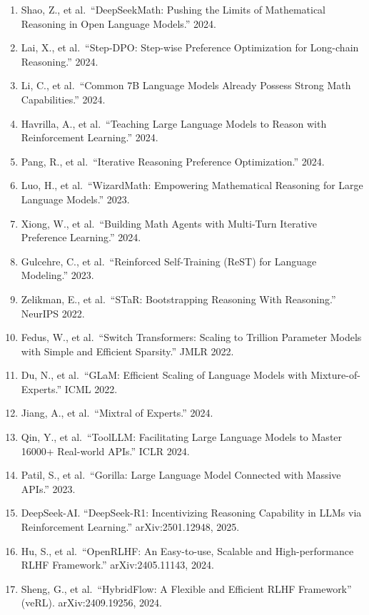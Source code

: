\documentclass[
  american,
  11pt,
  a4paper,
  oneside]{report}
\providecommand{\tightlist}{%
  \setlength{\itemsep}{0pt}\setlength{\parskip}{0pt}}
\begin{document}
\begin{enumerate}
\def\labelenumi{\arabic{enumi}.}
\tightlist
\item
  Shao, Z., et al.~``DeepSeekMath: Pushing the Limits of Mathematical
  Reasoning in Open Language Models.'' 2024.
\item
  Lai, X., et al.~``Step-DPO: Step-wise Preference Optimization for
  Long-chain Reasoning.'' 2024.
\item
  Li, C., et al.~``Common 7B Language Models Already Possess Strong Math
  Capabilities.'' 2024.
\item
  Havrilla, A., et al.~``Teaching Large Language Models to Reason with
  Reinforcement Learning.'' 2024.
\item
  Pang, R., et al.~``Iterative Reasoning Preference Optimization.''
  2024.
\item
  Luo, H., et al.~``WizardMath: Empowering Mathematical Reasoning for
  Large Language Models.'' 2023.
\item
  Xiong, W., et al.~``Building Math Agents with Multi-Turn Iterative
  Preference Learning.'' 2024.
\item
  Gulcehre, C., et al.~``Reinforced Self-Training (ReST) for Language
  Modeling.'' 2023.
\item
  Zelikman, E., et al.~``STaR: Bootstrapping Reasoning With Reasoning.''
  NeurIPS 2022.
\item
  Fedus, W., et al.~``Switch Transformers: Scaling to Trillion Parameter
  Models with Simple and Efficient Sparsity.'' JMLR 2022.
\item
  Du, N., et al.~``GLaM: Efficient Scaling of Language Models with
  Mixture-of-Experts.'' ICML 2022.
\item
  Jiang, A., et al.~``Mixtral of Experts.'' 2024.
\item
  Qin, Y., et al.~``ToolLLM: Facilitating Large Language Models to
  Master 16000+ Real-world APIs.'' ICLR 2024.
\item
  Patil, S., et al.~``Gorilla: Large Language Model Connected with
  Massive APIs.'' 2023.
\item
  DeepSeek-AI. ``DeepSeek-R1: Incentivizing Reasoning Capability in LLMs
  via Reinforcement Learning.'' arXiv:2501.12948, 2025.
\item
  Hu, S., et al.~``OpenRLHF: An Easy-to-use, Scalable and
  High-performance RLHF Framework.'' arXiv:2405.11143, 2024.
\item
  Sheng, G., et al.~``HybridFlow: A Flexible and Efficient RLHF
  Framework'' (veRL). arXiv:2409.19256, 2024.

\end{enumerate}
\end{document}
